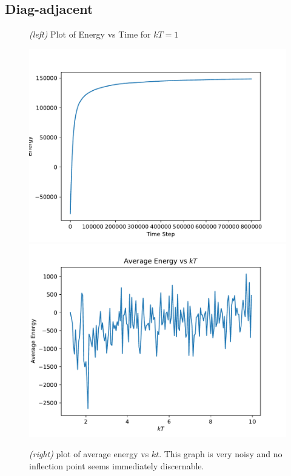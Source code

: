 \documentclass{article}
\begin{document}
\subsection*{Diag-adjacent}
\begin{figure}[H]
  \caption{\textit{(left)} Plot of Energy vs Time for $kT = 1$}
  \includegraphics[scale=0.35]{d_e_0.pdf}
  \includegraphics[scale=0.35]{d_avg_energy.pdf}
  \caption{\textit{(right)} plot of average energy vs $kt$.
    This graph is very noisy and no inflection point seems immediately discernable.}
\end{figure}
\end{document}
